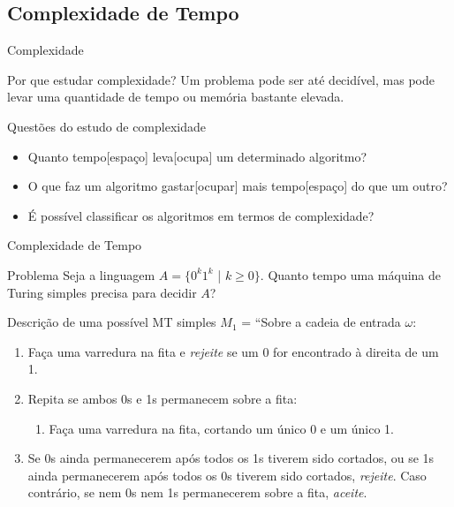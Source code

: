 \documentclass[xcolor=dvipsnames,table]{beamer}
\begin{document}
	\subsection{Complexidade de Tempo}	
	\begin{frame}{Complexidade}
		\begin{block}{Por que estudar complexidade?}
			Um problema pode ser até decidível, mas pode levar uma quantidade de tempo ou memória bastante elevada.
		\end{block} 
		\begin{block}{Questões do estudo de complexidade}
			\begin{itemize}
				\item Quanto tempo[espaço] leva[ocupa] um determinado algoritmo?
				\item O que faz um algoritmo gastar[ocupar] mais tempo[espaço] do que um outro?
				\item É possível classificar os algoritmos em termos de complexidade?
			\end{itemize}
		\end{block}
	\end{frame}
	
	\begin{frame}[shrink]{Complexidade de Tempo}
		\begin{block}{Problema}
			Seja a linguagem $A = \{ 0^k 1^k$ | $k \geq 0 \}$. Quanto tempo uma máquina de Turing simples precisa para decidir $A$?
		\end{block} 
		\begin{block}{Descrição de uma possível MT simples}
			$M_1$ = ``Sobre a cadeia de entrada $\omega$:
			\begin{enumerate}
				\item Faça uma varredura na fita e {\it rejeite} se um 0 for encontrado à direita de um 1.
				\item Repita se ambos 0s e 1s permanecem sobre a fita:
				\begin{enumerate}
					\item Faça uma varredura na fita, cortando um único 0 e um único 1.
				\end{enumerate}
				\item Se 0s ainda permanecerem após todos os 1s tiverem sido cortados, ou se 1s ainda permanecerem após todos os 0s tiverem sido cortados, {\it rejeite}. Caso contrário, se nem 0s nem 1s permanecerem sobre a fita, {\it aceite}.
			\end{enumerate}
		\end{block}
	\end{frame}
	
\end{document}
